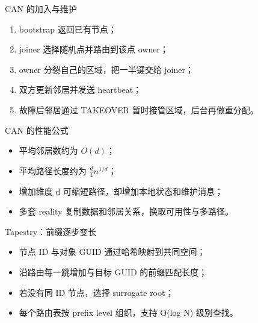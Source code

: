 \documentclass[UTF8,fontset=none,aspectratio=169,10pt]{beamer}
\begin{document}
\begin{frame}{CAN 的加入与维护}
\begin{enumerate}
  \item bootstrap 返回已有节点；
  \item joiner 选择随机点并路由到该点 owner；
  \item owner 分裂自己的区域，把一半键交给 joiner；
  \item 双方更新邻居并发送 heartbeat；
  \item 故障后邻居通过 TAKEOVER 暂时接管区域，后台再做重分配。
\end{enumerate}
\end{frame}

\begin{frame}{CAN 的性能公式}
\begin{itemize}
  \item 平均邻居数约为 $O(d)$；
  \item 平均路径长度约为 $\frac d4 n^{1/d}$；
  \item 增加维度 d 可缩短路径，却增加本地状态和维护消息；
  \item 多套 reality 复制数据和邻居关系，换取可用性与多路径。
\end{itemize}
\vfill
{}
\end{frame}

\begin{frame}{Tapestry：前缀逐步变长}
\begin{itemize}
  \item 节点 ID 与对象 GUID 通过哈希映射到共同空间；
  \item 沿路由每一跳增加与目标 GUID 的前缀匹配长度；
  \item 若没有同 ID 节点，选择 surrogate root；
  \item 每个路由表按 prefix level 组织，支持 O(log N) 级别查找。
\end{itemize}
\begin{center}
\end{center}
\end{frame}
\end{document}
